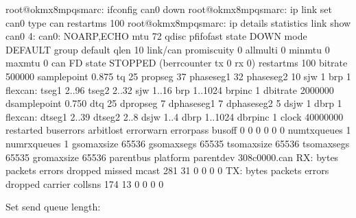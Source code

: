 \documentclass[letterpaper,10pt,openany,english]{sphinxmanual}
\begin{document}
\begin{sphinxVerbatim}[commandchars=\\\{\}]
root@ok\PYGZhy{}mx8mpq\PYGZhy{}smarc:\PYGZti{}\PYGZsh{} ifconfig can0 down
root@ok\PYGZhy{}mx8mpq\PYGZhy{}smarc:\PYGZti{}\PYGZsh{} ip link set can0 type can restart\PYGZhy{}ms 100
root@ok\PYGZhy{}mx8mpq\PYGZhy{}smarc:\PYGZti{}\PYGZsh{} ip \PYGZhy{}details \PYGZhy{}statistics link show can0
4: can0: \PYGZlt{}NOARP,ECHO\PYGZgt{} mtu 72 qdisc pfifo\PYGZus{}fast state DOWN mode DEFAULT group default qlen 10
    link/can  promiscuity 0  allmulti 0 minmtu 0 maxmtu 0
    can \PYGZlt{}FD\PYGZgt{} state STOPPED (berr\PYGZhy{}counter tx 0 rx 0) restart\PYGZhy{}ms 100 
          bitrate 500000 sample\PYGZhy{}point 0.875
          tq 25 prop\PYGZhy{}seg 37 phase\PYGZhy{}seg1 32 phase\PYGZhy{}seg2 10 sjw 1 brp 1
          flexcan: tseg1 2..96 tseg2 2..32 sjw 1..16 brp 1..1024 brp\PYGZus{}inc 1
          dbitrate 2000000 dsample\PYGZhy{}point 0.750
          dtq 25 dprop\PYGZhy{}seg 7 dphase\PYGZhy{}seg1 7 dphase\PYGZhy{}seg2 5 dsjw 1 dbrp 1
          flexcan: dtseg1 2..39 dtseg2 2..8 dsjw 1..4 dbrp 1..1024 dbrp\PYGZus{}inc 1
          clock 40000000 
          re\PYGZhy{}started bus\PYGZhy{}errors arbit\PYGZhy{}lost error\PYGZhy{}warn error\PYGZhy{}pass bus\PYGZhy{}off
          0          0          0          0          0          0         numtxqueues 1 numrxqueues 1 gso\PYGZus{}max\PYGZus{}size 65536 gso\PYGZus{}max\PYGZus{}segs 65535 tso\PYGZus{}max\PYGZus{}size 65536 tso\PYGZus{}max\PYGZus{}segs 65535 gro\PYGZus{}max\PYGZus{}size 65536 parentbus platform parentdev 308c0000.can 
    RX:  bytes packets errors dropped  missed   mcast           
           281      31      0       0       0       0 
    TX:  bytes packets errors dropped carrier collsns           
           174      13      0       0       0       0
\end{sphinxVerbatim}

\sphinxAtStartPar
Set send queue length:
\end{document}

